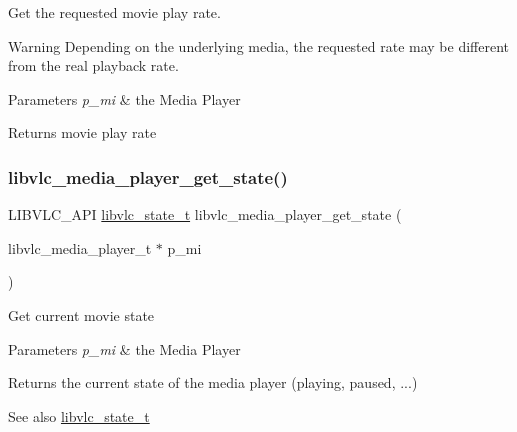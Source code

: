 Get the requested movie play rate. \begin{DoxyWarning}{Warning}
Depending on the underlying media, the requested rate may be different from the real playback rate.
\end{DoxyWarning}

\begin{DoxyParams}{Parameters}
{\em p\+\_\+mi} & the Media Player \\
\hline
\end{DoxyParams}
\begin{DoxyReturn}{Returns}
movie play rate 
\end{DoxyReturn}
\mbox{\label{group__libvlc__media__player_gac6537a6b1387db3a96b48947b0aa8b87}} 
\subsubsection{\texorpdfstring{libvlc\+\_\+media\+\_\+player\+\_\+get\+\_\+state()}{libvlc\_media\_player\_get\_state()}}
{\footnotesize\ttfamily L\+I\+B\+V\+L\+C\+\_\+\+A\+PI \hyperlink{group__libvlc__media_gac88ad60037ea05e1f23675a2ebe31efc}{libvlc\+\_\+state\+\_\+t} libvlc\+\_\+media\+\_\+player\+\_\+get\+\_\+state (\begin{DoxyParamCaption}\item[{libvlc\+\_\+media\+\_\+player\+\_\+t $\ast$}]{p\+\_\+mi }\end{DoxyParamCaption})}

Get current movie state


\begin{DoxyParams}{Parameters}
{\em p\+\_\+mi} & the Media Player \\
\hline
\end{DoxyParams}
\begin{DoxyReturn}{Returns}
the current state of the media player (playing, paused, ...) 
\end{DoxyReturn}
\begin{DoxySeeAlso}{See also}
\hyperlink{group__libvlc__media_gaffb7eef042375f78ec9a6f1ae11ae0c3}{libvlc\+\_\+state\+\_\+t} 
\end{DoxySeeAlso}
\mbox{\label{group__libvlc__media__player_ga1a5ccaa2c044ded47205cd0754f68370}} 
